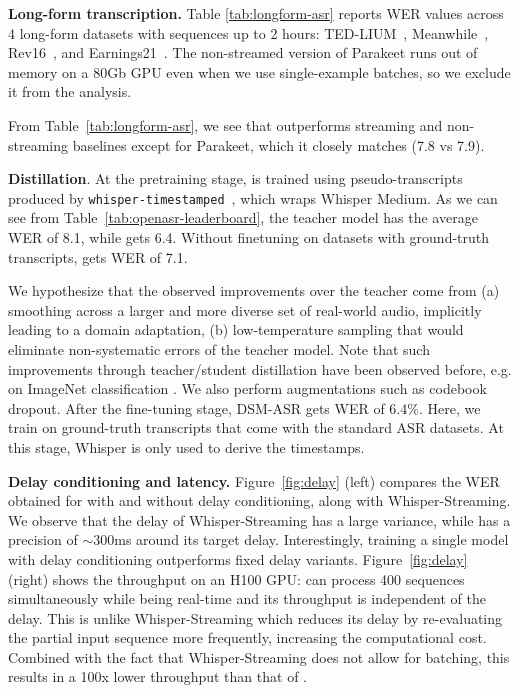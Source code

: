 \documentclass{article}
\begin{document}
\textbf{Long-form transcription.}
Table \ref{tab:longform-asr} reports WER values across 4 long-form datasets with sequences up to 2 hours: TED-LIUM~\citep{tedlium}, Meanwhile~\citep{whisper}, Rev16~\citep{whisper}, and Earnings21~\citep{earnings21}. %
The non-streamed version of Parakeet runs out of memory on a 80Gb GPU even when we use single-example batches, so we exclude it from the analysis.

From Table~\ref{tab:longform-asr}, we see that \oursASR{} outperforms streaming and non-streaming baselines except for Parakeet, which it closely matches (7.8 vs 7.9).

\textbf{Distillation}. At the pretraining stage, \oursASR{} is trained using pseudo-transcripts produced by \texttt{whisper-timestamped}~\citep{lintoai2023whispertimestamped}, which wraps Whisper Medium. As we can see from Table~\ref{tab:openasr-leaderboard}, the teacher model has the average WER of 8.1, while \oursASR{} gets 6.4. Without finetuning on datasets with ground-truth transcripts, \oursASR{} gets WER of 7.1.

We hypothesize that the observed improvements over the teacher come from (a) smoothing across a larger and more diverse set of real-world audio, implicitly leading to a domain adaptation, (b) low-temperature sampling that would eliminate non-systematic errors of the teacher model. Note that such improvements through teacher/student distillation have been observed before, e.g. on ImageNet classification \citep{yalniz2019billion}. We also perform augmentations such as codebook dropout.
After the fine-tuning stage, DSM-ASR gets WER of 6.4\%. Here, we train on ground-truth transcripts that come with the standard ASR datasets. At this stage, Whisper is only used to derive the timestamps.




\textbf{Delay conditioning and latency.}
Figure~\ref{fig:delay} (left) compares the WER obtained for \oursASR{} with and without delay conditioning, along with Whisper-Streaming. We observe that the delay of Whisper-Streaming has a large variance, while \oursASR{} has a precision of $\sim$300ms around its target delay. 
Interestingly, training a single \oursASR{} model with delay conditioning outperforms
fixed delay variants.
Figure~\ref{fig:delay} (right) shows the throughput on an H100 GPU: \oursASR{} can process 400 sequences simultaneously while being real-time and its throughput is independent of the delay. This is unlike Whisper-Streaming which reduces its delay by re-evaluating the partial input sequence more frequently, increasing the computational cost. Combined with the fact that Whisper-Streaming does not allow for batching, this results in a 100x lower throughput than that of \oursASR{}.
\end{document}
